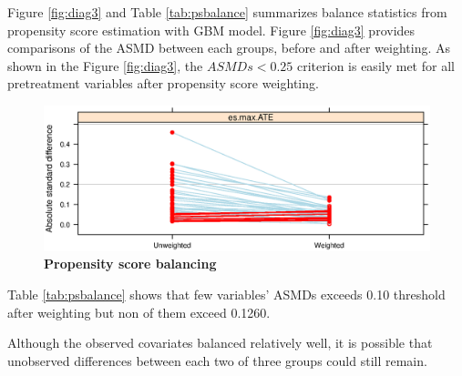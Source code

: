 \documentclass[12pt]{report}
\begin{document}
Figure \ref{fig:diag3} and Table \ref{tab:psbalance} summarizes balance statistics from propensity score estimation with GBM model. Figure \ref{fig:diag3} provides comparisons of the ASMD between each groups, before and after weighting. As shown in the Figure \ref{fig:diag3}, the $ASMDs<0.25$ criterion is easily met for all pretreatment variables after propensity score weighting. 

\begin{figure}[!htb]
\begin{center}
\includegraphics[width=\textwidth]{psdiag3.eps}
\caption{{\bf Propensity score balancing}}
\label{fig.diag3}
\end{center}
\end{figure}

Table \ref{tab:psbalance} shows that few variables' ASMDs exceeds 0.10 threshold after weighting but non of them exceed 0.1260. 

Although the observed covariates balanced relatively well, it is possible that unobserved differences between each two of three groups could still remain.
\end{document}
